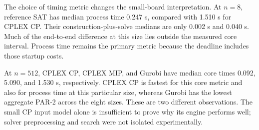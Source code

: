 The choice of timing metric changes the small-board interpretation. At $n=8$, reference SAT has median process time 0.247 s, compared with 1.510 s for CPLEX CP. Their construction-plus-solve medians are only 0.002 s and 0.040 s. Much of the end-to-end difference at this size lies outside the measured core interval. Process time remains the primary metric because the deadline includes those startup costs.

At $n=512$, CPLEX CP, CPLEX MIP, and Gurobi have median core times 0.092, 5.090, and 1.530 s, respectively. CPLEX CP is fastest for this core metric and also for process time at this particular size, whereas Gurobi has the lowest aggregate PAR-2 across the eight sizes. These are two different observations. The small CP input model alone is insufficient to prove why its engine performs well; solver preprocessing and search were not isolated experimentally.

